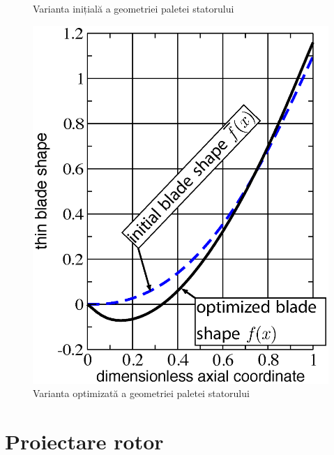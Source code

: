 \begin{figure}[h]
	\caption{Varianta inițială a geometriei paletei statorului}
	\label{Varianta inițială a geometriei paletei statorului}
\end{figure}

\begin{figure}[h]
	\centering
	\includegraphics[scale=0.5]{figures/stator_optimized_blade.eps}
	\caption{Varianta optimizată a geometriei paletei statorului}
	\label{Varianta optimizată a geometriei paletei statorului}
\end{figure}

\clearpage



\section{Proiectare rotor}


